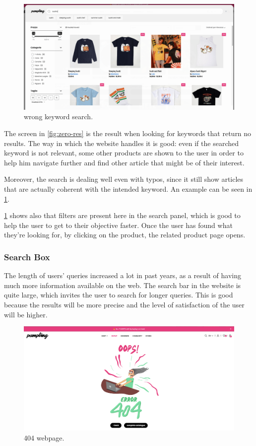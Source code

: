 \begin{figure}[h!]
	\centering
	\includegraphics[scale=0.225]{images/wrong-search.png}
	\caption{wrong keyword search.}
	\label{fig:wrong-search}
\end{figure}

The screen in \cref{fig:zero-res} is the result when looking for keywords that return no results.
The way in which the website handles it is good: even if the searched keyword is not relevant, some other products are shown
to the user in order to help him navigate further and find other article that might be of their interest.

Moreover, the search is dealing well even with typos, since it still show articles that are actually coherent with the 
intended keyword. An example can be seen in \cref{fig:wrong-search}.

\cref{fig:wrong-search} shows also that filters are present here in the search panel, which is good to 
help the user to get to their objective faster.
Once the user has found what they're looking for, by clicking on the product, the related product page opens.

\subsubsection{Search Box}
The length of users' queries increased a lot in past years, as a result of having much more information available on the web.
The search bar in the website is quite large, which invites the user to search for longer queries. This is good because 
the results will be more precise and the level of satisfaction of the user will be higher. 

\begin{figure}[h!]
	\centering
	\includegraphics[scale=0.225]{images/404.png}
	\caption{404 webpage.}
	\label{fig:404}
\end{figure}
